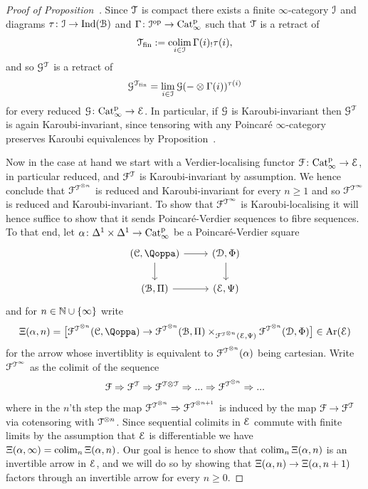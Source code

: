 \begin{proof}[Proof of Proposition~]
Since $\mathcal{T}$ is compact there exists a finite $\infty$-category $\mathcal{I}$ and diagrams $\tau\colon \mathcal{I} \to \operatorname{Ind}(\mathcal{B})$ and $\Gamma\colon \mathcal{I}^\mathrm{op} \to \mathrm{Cat}^{\mathrm p}_\infty$ such that $\mathcal{T}$ is a retract of
\[
\mathcal{T}_{\mathrm{fin}} := \mathop{\mathrm{colim}}_{i \in \mathcal{I}} \Gamma(i)_!\tau(i) ,
\]
and so $\mathcal{G}^{\mathcal{T}}$ is a retract of 
\[
\mathcal{G}^{\mathcal{T}_{\mathrm{fin}}} =  \lim_{i \in \mathcal{I}} \mathcal{G}(-\otimes \Gamma(i))^{\tau(i)}
\]
for every reduced $\mathcal{G}\colon \mathrm{Cat}^{\mathrm p}_\infty \to \mathcal{E}$. In particular, if $\mathcal{G}$ is Karoubi-invariant then $\mathcal{G}^{\mathcal{T}}$ is again Karoubi-invariant, since tensoring with any Poincaré $\infty$-category preserves Karoubi equivalences by Proposition~\;. 

Now in the case at hand we start with a Verdier-localising functor $\mathcal{F}\colon \mathrm{Cat}^{\mathrm p}_\infty \to \mathcal{E}$, in particular reduced, and $\mathcal{F}^{\mathcal{T}}$ is Karoubi-invariant by assumption. We hence conclude that $\mathcal{F}^{\mathcal{T}^{\otimes n}}$ is reduced and Karoubi-invariant for every $n \geq 1$ and so $\mathcal{F}^{\mathcal{T}^{\infty}}$ is reduced and Karoubi-invariant. To show that $\mathcal{F}^{\mathcal{T}^{\infty}}$ is Karoubi-localising it will hence suffice to show that it sends Poincar\'e-Verdier sequences to fibre sequences. To that end, let $\alpha\colon \Delta^1\times \Delta^1 \to \mathrm{Cat}^{\mathrm p}_\infty$ be a Poincaré-Verdier square
\[
\begin{tikzcd}
(\C,\QF)\ar[r]\ar[d] & (\D,\QFD) \ar[d] \\
(\cB,\Pi)\ar[r] & (\E,\QFE)
\end{tikzcd}
\]
and for $n \in \mathbb{N} \cup \{\infty\}$ write
\[
\Xi(\alp,n) = \bigl[\F^{\T^{\otimes n}}(\C,\QF)  \to \F^{\T^{\otimes n}}(\cB,\Pi)\times_{\F^{\T^{\otimes n}}(\E,\QFE)} \F^{\T^{\otimes n}}(\D,\QFD)\bigr] \in \Ar(\E)
\]
for the arrow whose invertiblity is equivalent to $\mathcal{F}^{\mathcal{T}^{\otimes n}}(\alpha)$ being cartesian.
Write $\mathcal{F}^{\mathcal{T}^{\infty}}$ as the colimit of the sequence
\[
\mathcal{F} \Rightarrow \mathcal{F}^{\mathcal{T}} \Rightarrow \mathcal{F}^{\mathcal{T}\otimes \mathcal{T}} \Rightarrow ... \Rightarrow \mathcal{F}^{\mathcal{T}^{\otimes n}} \Rightarrow ...
\]
where in the $n$'th step the map $\mathcal{F}^{\mathcal{T}^{\otimes n}} \Rightarrow \mathcal{F}^{\mathcal{T}^{\otimes n+1}}$ is induced by the map $\mathcal{F} \to \mathcal{F}^{\mathcal{T}}$ via cotensoring with $\mathcal{T}^{\otimes n}$.
Since sequential colimits in $\mathcal{E}$ commute with finite limits by the assumption that $\mathcal{E}$ is differentiable we have $\Xi(\alpha,\infty) = \mathop{\mathrm{colim}}_n \Xi(\alpha,n)$.
Our goal is hence to show that 
$\mathop{\mathrm{colim}}_n \Xi(\alpha,n)$ is an invertible arrow in $\mathcal{E}$, and we will do so by showing that $\Xi(\alpha,n) \to \Xi(\alpha,n+1)$ factors through an invertible arrow for every $n \geq 0$. 


\end{proof}
